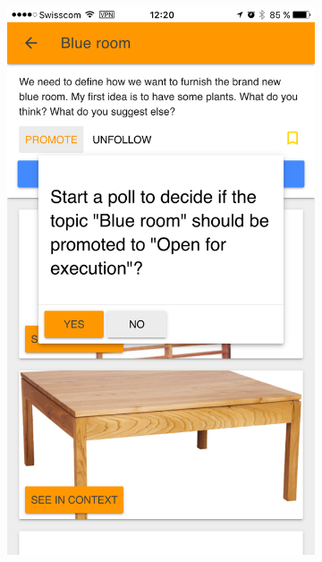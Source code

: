 \documentclass[a4paper,12pt, oneside]{article}
\begin{document}
\begin{figure}[!htb]
    \begin{subfigure}[t]{.32\textwidth}
        \includegraphics[width=\textwidth]{images/promotionPoll_dialog.png}
    \end{subfigure}
    \hfill
    \begin{subfigure}[t]{.32\textwidth}

\end{subfigure}
\end{figure}
\end{document}

